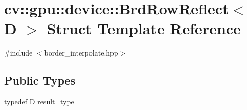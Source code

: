 \hypertarget{structcv_1_1gpu_1_1device_1_1BrdRowReflect}{\section{cv\-:\-:gpu\-:\-:device\-:\-:Brd\-Row\-Reflect$<$ D $>$ Struct Template Reference}
\label{structcv_1_1gpu_1_1device_1_1BrdRowReflect}
}


{\ttfamily \#include $<$border\-\_\-interpolate.\-hpp$>$}

\subsection*{Public Types}
\begin{DoxyCompactItemize}
\item 
typedef D \hyperlink{structcv_1_1gpu_1_1device_1_1BrdRowReflect_a934c04004c9fe9ed336e992db3abe8fd}{result\-\_\-type}
\end{DoxyCompactItemize}
